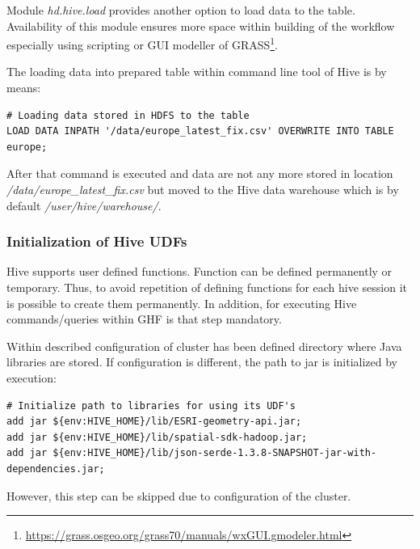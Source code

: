 \documentclass[a4paper,12pt,oneside]{report}
\begin{document}
    Module \textit{hd.hive.load} provides another option to load data to the table.
	Availability of this module ensures more space within building of the workflow
	especially using scripting or GUI modeller of
	GRASS\footnote{\url{https://grass.osgeo.org/grass70/manuals/wxGUI.gmodeler.html}}.
	
	The loading data into prepared table within command line tool of Hive is by means:
\begin{footnotesize}
	\begin{lstlisting}[style=python]
# Loading data stored in HDFS to the table
LOAD DATA INPATH '/data/europe_latest_fix.csv' OVERWRITE INTO TABLE  europe;
		\end{lstlisting}
	\end{footnotesize}
 	After that command is executed and data are not any more stored in
	location\textit{ /data/europe\_latest\_fix.csv} but moved to the Hive  data
	warehouse which is by default \textit{/user/hive/warehouse/}.




\subsubsection{Initialization of Hive UDFs}
	Hive supports user defined functions. Function can be defined permanently or
	temporary. Thus, to avoid repetition of defining functions for each hive session it
	is possible to create them permanently. In addition, for executing Hive
	commands/queries within GHF is that step mandatory.  
	
	Within described configuration of cluster has been defined directory where Java
	libraries are stored. If configuration is different, the path to jar is
	initialized by execution:
\begin{footnotesize}
	\begin{lstlisting}[style=python]
# Initialize path to libraries for using its UDF's
add jar ${env:HIVE_HOME}/lib/ESRI-geometry-api.jar;
add jar ${env:HIVE_HOME}/lib/spatial-sdk-hadoop.jar;
add jar ${env:HIVE_HOME}/lib/json-serde-1.3.8-SNAPSHOT-jar-with-dependencies.jar;
		\end{lstlisting}
	\end{footnotesize}
	However, this step can be skipped due to configuration of the cluster.
	
\end{document}
